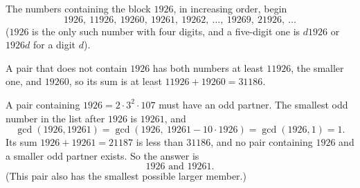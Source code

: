 The numbers containing the block $1926$, in increasing order, begin
\[1926,\ 11926,\ 19260,\ 19261,\ 19262,\ \dots,\ 19269,\ 21926,\ \dots\]
($1926$ is the only such number with four digits, and a five-digit one is $d1926$ or $1926d$ for a digit $d$).

A pair that does not contain $1926$ has both numbers at least $11926$, the smaller one, and $19260$, so its sum is at least $11926+19260=31186$.

A pair containing $1926=2\cdot3^2\cdot107$ must have an odd partner. The smallest odd number in the list after $1926$ is $19261$, and
\[\gcd(1926,19261)=\gcd(1926,\ 19261-10\cdot1926)=\gcd(1926,1)=1.\]
Its sum $1926+19261=21187$ is less than $31186$, and no pair containing $1926$ and a smaller odd partner exists. So the answer is
\[\boxed{1926\text{ and }19261}.\]
(This pair also has the smallest possible larger member.)

